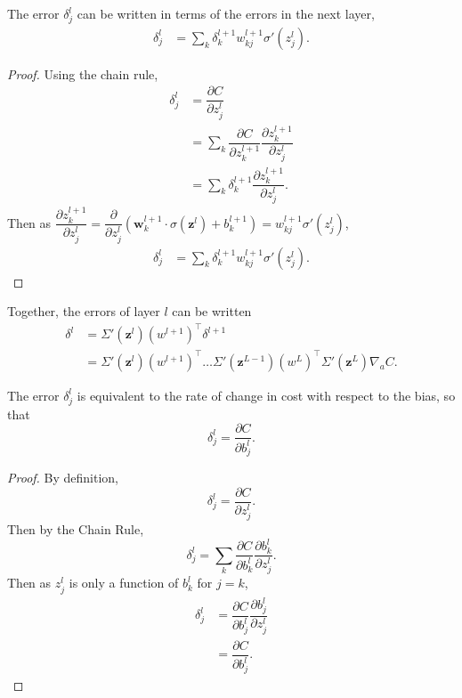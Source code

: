 \begin{proposition}
	The error $\delta_j^l$ can be written in terms of the errors in the next layer, 
	\begin{align*}
		\delta_j^l & = \sum_k\delta_k^{l+1}w_{kj}^{l+1}\sigma'(z_j^l).
	\end{align*}
\end{proposition}

\begin{proof}
	Using the chain rule,
	\begin{align*}
		\delta_j^l & = \dfrac{\partial C}{\partial z_j^l} \\
		& = \sum_k\dfrac{\partial C}{\partial z_k^{l+1}}\dfrac{\partial z_k^{l+1}}{\partial z_j^l} \\
		& = \sum_k\delta_k^{l+1}\dfrac{\partial z_k^{l+1}}{\partial z_j^l}.
	\end{align*}
	Then as $\dfrac{\partial z_k^{l+1}}{\partial z_j^l} = \dfrac{\partial}{\partial z_j^l}(\mathbf{w}_k^{l+1}\cdot\sigma(\mathbf{z}^{l}) + b_k^{l+1}) = w_{kj}^{l+1}\sigma'(z_j^l)$,
	\begin{align*}
		\delta_j^l & = \sum_k\delta_k^{l+1}w_{kj}^{l+1}\sigma'(z_j^l).
	\end{align*}
\end{proof}


Together, the errors of layer $l$ can be written
\begin{align*}
	\delta^l & = \Sigma'(\mathbf{z}^l)(w^{l+1})^\top\delta^{l+1} \\
	& = \Sigma'(\mathbf{z}^l)(w^{l+1})^\top\ldots\Sigma'(\mathbf{z}^{L-1})(w^L)^\top\Sigma'(\mathbf{z}^L)\nabla_aC.
\end{align*}

\begin{proposition}
	The error $\delta_j^l$ is equivalent to the rate of change in cost with respect to the bias, so that
	\[
		\delta_j^l = \dfrac{\partial C}{\partial b_j^l}.
	\]
\end{proposition}
\begin{proof}
	By definition,
	\[
		\delta_j^l = \dfrac{\partial C}{\partial z_j^l}.
	\]
	Then by the Chain Rule,
	\[
		\delta_j^l = \sum_k\dfrac{\partial C}{\partial b_k^l}\dfrac{\partial b_k^l}{\partial z_j^l}.
	\]
	Then as $z_j^l$ is only a function of $b_k^l$ for $j = k$,
	\begin{align*}
		\delta_j^l & = \dfrac{\partial C}{\partial b_j^l}\dfrac{\partial b_j^l}{\partial z_j^l} \\
		& = \dfrac{\partial C}{\partial b_j^l}.
	\end{align*}
\end{proof}


